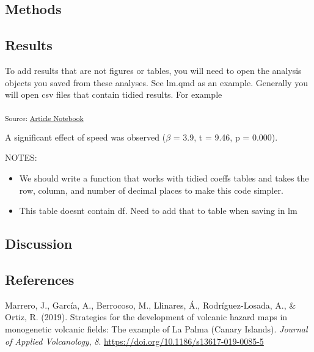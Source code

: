 \documentclass[
]{agujournal2019}
\providecommand{\tightlist}{%
  \setlength{\itemsep}{0pt}\setlength{\parskip}{0pt}}\usepackage{longtable,booktabs,array}
\newlength{\cslhangindent}
\newenvironment{CSLReferences}[2] %
 {\begin{list}{}{%
  \setlength{\itemindent}{0pt}
  \setlength{\leftmargin}{0pt}
  \setlength{\parsep}{0pt}
  \ifodd #1
   \setlength{\leftmargin}{\cslhangindent}
   \setlength{\itemindent}{-1\cslhangindent}
  \fi
  \setlength{\itemsep}{#2\baselineskip}}}
 {\end{list}}
\begin{document}
\subsection{Methods}\label{sec-methods}

\subsection{Results}\label{sec-results}

To add results that are not figures or tables, you will need to open the
analysis objects you saved from these analyses. See lm.qmd as an
example. Generally you will open csv files that contain tidied results.
For example

\textsubscript{Source:
\href{https://seschneck.github.io/study_test/index.qmd.html}{Article
Notebook}}

A significant effect of speed was observed (\(\beta\) = 3.9, t = 9.46, p
= 0.000).

NOTES:

\begin{itemize}
\tightlist
\item
  We should write a function that works with tidied coeffs tables and
  takes the row, column, and number of decimal places to make this code
  simpler.
\item
  This table doesnt contain df. Need to add that to table when saving in
  lm
\end{itemize}

\subsection{Discussion}\label{sec-discussion}

\subsection*{References}\label{references-1}

\label{refs}
\begin{CSLReferences}{1}{0}
\vspace{1em}

Marrero, J., García, A., Berrocoso, M., Llinares, Á., Rodríguez-Losada,
A., \& Ortiz, R. (2019). Strategies for the development of volcanic
hazard maps in monogenetic volcanic fields: The example of {La} {Palma}
({Canary} {Islands}). \emph{Journal of Applied Volcanology}, \emph{8}.
\url{https://doi.org/10.1186/s13617-019-0085-5}

\end{CSLReferences}
\end{document}
